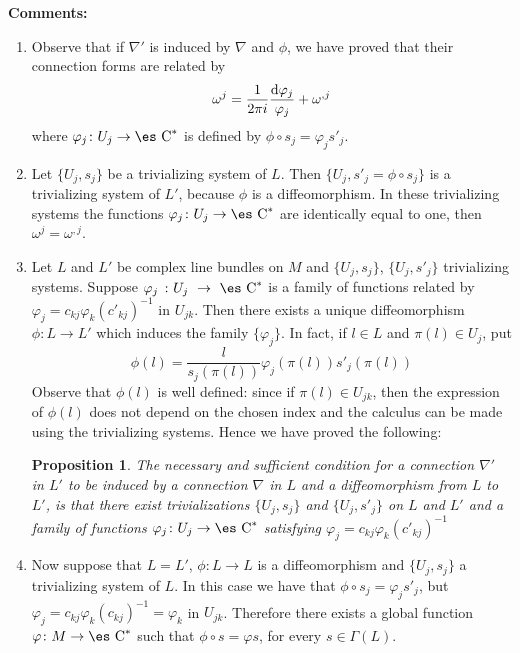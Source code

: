 \documentclass[12pt]{article}
\newtheorem{prop}{Proposition}
\def\beq{\begin{equation}}
\def\eeq{\end{equation}}
\def\d{{\rm d}}
\def\Complex{\mbox{\es C}}
\begin{document}
{\bf Comments:}
\begin{enumerate}
\item
Observe that if $\nabla '$ is induced by $\nabla$ and $\phi$,
we have proved that their connection forms are related by
\beq
\omega^j = \frac{1}{2\pi i}\frac{\d \varphi_j}{\varphi_j} + \omega^{,j}
\label{numerado}
\eeq
where $\varphi_j \colon U_j \to \Complex^*$ is defined by
$\phi \circ s_j = \varphi_j s'_j$.
\item
Let $\{ U_j,s_j \}$ be a trivializing system of $L$.
Then $\{ U_j,s'_j=\phi \circ s_j \}$ is a trivializing system of $L'$,
because $\phi$ is a diffeomorphism.
In these trivializing systems the functions
$\varphi_j \colon U_j \to \Complex^*$
are identically equal to one, then
$\omega^j = \omega^{,j}$.
\item
Let $L$ and $L'$ be complex line bundles on $M$
and $\{ U_j,s_j \}$, $\{ U_j,s'_j \}$
trivializing systems.
Suppose
$\varphi_j~\colon U_j~\to~\Complex^*$
is a family of functions related by
$\varphi_j = c_{kj} \varphi_k (c'_{kj})^{-1}$
in $U_{jk}$.
Then there exists a unique diffeomorphism
$\phi \colon L \to L'$
which induces the family $\{ \varphi_j \}$.
In fact, if $l \in L$ and $\pi (l) \in U_j$, put
$$
\phi (l) = \frac{l}{s_j (\pi (l))}\varphi_j (\pi (l))s'_j (\pi (l))
$$
Observe that $\phi (l)$ is well defined:
since if $\pi (l) \in U_{jk}$, then the expression of $\phi (l)$
does not depend on the chosen index and
the calculus can be made using the trivializing systems.
Hence we have proved the following:

\begin{prop}
The necessary and sufficient condition for
a connection $\nabla '$ in $L'$ to be induced by
a connection $\nabla$ in $L$ and a diffeomorphism
from $L$ to $L'$, is that there exist trivializations
$\{ U_j,s_j \}$ and $\{ U_j,s'_j \}$
on $L$ and $L'$ and a family of functions
$\varphi_j \colon U_j \to \Complex^*$
satisfying $\varphi_j = c_{kj} \varphi_k (c'_{kj})^{-1}$
\end{prop}

\item
Now suppose that $L = L'$,
$\phi \colon L \to L$ is a diffeomorphism and
$\{ U_j,s_j \}$ a trivializing system of $L$.
In this case we have that
$\phi \circ s_j = \varphi_j s'_j$,
but $\varphi_j = c_{kj}\varphi_k(c_{kj})^{-1}=\varphi_k$ in $U_{jk}$.
Therefore there exists a global function
$\varphi \colon M \to \Complex^*$
such that $\phi \circ s = \varphi s$, for every $s \in \Gamma (L)$.


\end{enumerate}
\end{document}
